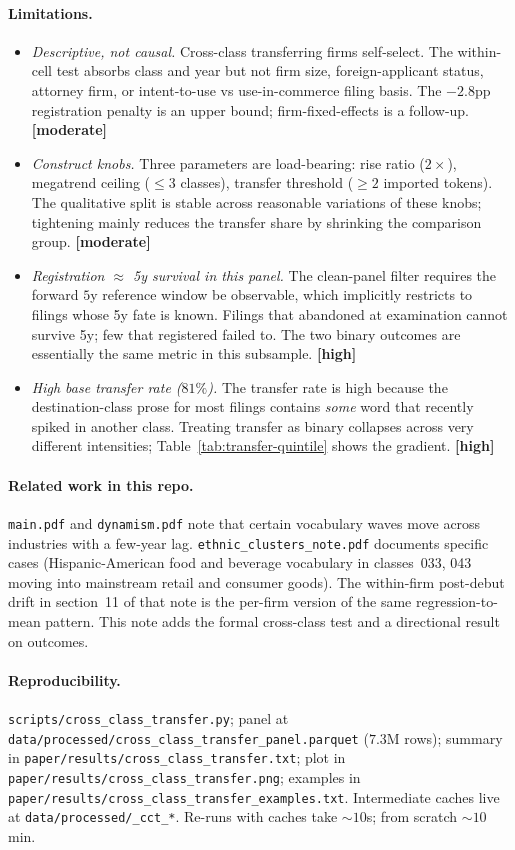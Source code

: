 \documentclass[11pt]{article}
\newcommand{\hi}{\textbf{[high]}}
\newcommand{\med}{\textbf{[moderate]}}
\begin{document}
\paragraph{Limitations.}
\begin{itemize}\setlength\itemsep{1pt}
\item \emph{Descriptive, not causal.} Cross-class transferring firms
self-select. The within-cell test absorbs class and year but not
firm size, foreign-applicant status, attorney firm, or
intent-to-use vs use-in-commerce filing basis. The $-2.8$pp
registration penalty is an upper bound; firm-fixed-effects is
a follow-up. \med
\item \emph{Construct knobs.} Three parameters are load-bearing: rise
ratio ($2{\times}$), megatrend ceiling ($\leq 3$ classes), transfer
threshold ($\geq 2$ imported tokens). The qualitative split is
stable across reasonable variations of these knobs; tightening
mainly reduces the transfer share by shrinking the comparison
group. \med
\item \emph{Registration $\approx$ 5y survival in this panel.} The
clean-panel filter requires the forward $5$y reference window be
observable, which implicitly restricts to filings whose 5y fate is
known. Filings that abandoned at examination cannot survive 5y; few
that registered failed to. The two binary outcomes are essentially
the same metric in this subsample. \hi
\item \emph{High base transfer rate ($81\%$).} The transfer rate is
high because the destination-class prose for most filings contains
\emph{some} word that recently spiked in another class. Treating
transfer as binary collapses across very different intensities;
Table~\ref{tab:transfer-quintile} shows the gradient. \hi
\end{itemize}

\paragraph{Related work in this repo.} \texttt{main.pdf} and
\texttt{dynamism.pdf} note that certain vocabulary waves move across
industries with a few-year lag. \texttt{ethnic\_clusters\_note.pdf}
documents specific cases (Hispanic-American food and beverage
vocabulary in classes~033, 043 moving into mainstream retail and
consumer goods). The within-firm post-debut drift in
section~11 of that note is the per-firm version of the same
regression-to-mean pattern. This note adds the formal cross-class
test and a directional result on outcomes.

\paragraph{Reproducibility.}
\texttt{scripts/cross\_class\_transfer.py};
panel at \texttt{data/processed/cross\_class\_transfer\_panel.parquet}
($7.3$M rows);
summary in \texttt{paper/results/cross\_class\_transfer.txt};
plot in \texttt{paper/results/cross\_class\_transfer.png};
examples in \texttt{paper/results/cross\_class\_transfer\_examples.txt}.
Intermediate caches live at \texttt{data/processed/\_cct\_*}. Re-runs
with caches take $\sim 10$s; from scratch $\sim 10$min.
\end{document}
